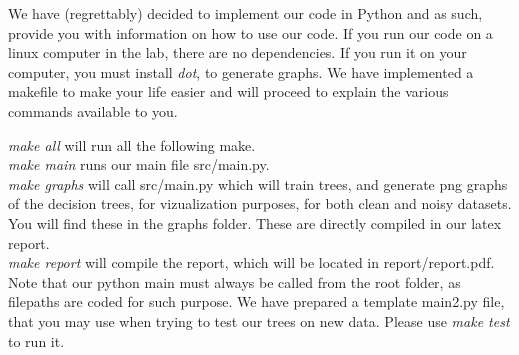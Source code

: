 We have (regrettably) decided to implement our code in Python and as such, provide you with information on how to use our code.
If you run our code on a linux computer in the lab, there are no dependencies. If you run it on your computer, you must install \emph{dot}, to generate graphs.
We have implemented a makefile to make your life easier and will proceed to explain the various commands available to you.

\emph{make all} will run all the following make.\\
\emph{make main} runs our main file src/main.py.\\
\emph{make graphs} will call src/main.py which will train trees, and generate png graphs of the decision trees, for vizualization purposes,
for both clean and noisy datasets. You will find these in the graphs folder.
These are directly compiled in our latex report.\\
\emph{make report} will compile the report, which will be located in report/report.pdf.\\


Note that our python main must always be called from the root folder, as filepaths are coded for such purpose.
We have prepared a template main2.py file, that you may use when trying to test our trees on new data.
Please use \emph{make test} to run it.




